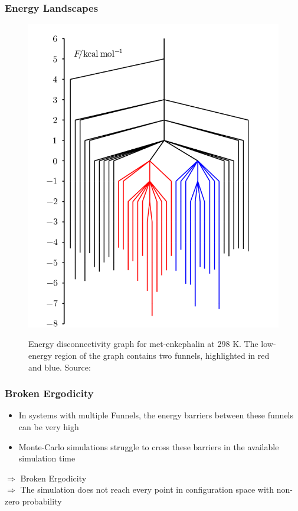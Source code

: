 \documentclass{beamer}
\begin{document}
	\begin{frame}
		\frametitle{Energy Landscapes}
		\begin{figure}
			\center
			\includegraphics[height=0.75\textheight]{figures/funnels.png}
			\label{fig:funnels}
			\caption{Energy disconnectivity graph for met-enkephalin at 298 K. The low-energy region of the graph contains two funnels, highlighted in red and blue. Source: \cite{Wales2005}}
		\end{figure}
	\end{frame}

	\begin{frame}
		\frametitle{Broken Ergodicity}
		\begin{itemize}
			\item In systems with multiple Funnels, the energy barriers between these funnels can be very high
			\item Monte-Carlo simulations struggle to cross these barriers in the available simulation time
		\end{itemize}
		$\Longrightarrow$ Broken Ergodicity\\
		$\Longrightarrow$ The simulation does not reach every point in configuration space with non-zero probability
	\end{frame}
\end{document}

